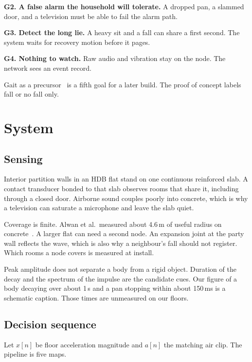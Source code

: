 \documentclass[sigconf]{acmart}
\begin{document}
\textbf{G2. A false alarm the household will tolerate.} A dropped pan, a slammed door, and a television must be able to fail the alarm path.

\textbf{G3. Detect the long lie.} A heavy sit and a fall can share a first second. The system waits for recovery motion before it pages.

\textbf{G4. Nothing to watch.} Raw audio and vibration stay on the node. The network sees an event record.

Gait as a precursor~\cite{hausdorff2001} is a fifth goal for a later build. The proof of concept labels fall or no fall only.

\section{System}

\subsection{Sensing}

Interior partition walls in an HDB flat stand on one continuous reinforced slab. A contact transducer bonded to that slab observes rooms that share it, including through a closed door. Airborne sound couples poorly into concrete, which is why a television can saturate a microphone and leave the slab quiet.

Coverage is finite. Alwan et al.\ measured about 4.6\,m of useful radius on concrete~\cite{alwan2006}. A larger flat can need a second node. An expansion joint at the party wall reflects the wave, which is also why a neighbour's fall should not register. Which rooms a node covers is measured at install.

Peak amplitude does not separate a body from a rigid object. Duration of the decay and the spectrum of the impulse are the candidate cues. Our figure of a body decaying over about 1\,s and a pan stopping within about 150\,ms is a schematic caption. Those times are unmeasured on our floors.

\subsection{Decision sequence}

Let \(x[n]\) be floor acceleration magnitude and \(a[n]\) the matching air clip. The pipeline is five maps.
\end{document}
